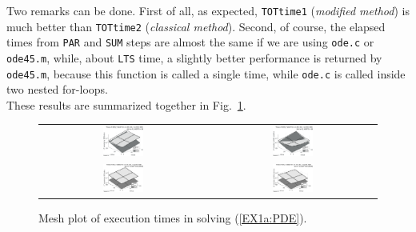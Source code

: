 \documentclass[a4paper,10pt]{report}%
\begin{document}
Two remarks can be done. First of all, as expected, {\tt TOTtime1} ({\em modified method}) is much better than
{\tt TOTtime2} ({\em classical method}). Second, of course, the elapsed times from {\tt PAR} and {\tt SUM}
steps are almost the same if we are using {\tt ode.c} or {\tt ode45.m}, while, about {\tt LTS} time, a slightly
better performance is returned by {\tt ode45.m}, because this function is called a single time, while {\tt ode.c} is called inside two nested for-loops.
\\
These results are summarized together in Fig.~\ref{EX1a_times3D_tol4}.
\begin{figure}[htb]
\centering
\begin{tabular}{cc}
\includegraphics[width=0.25\textwidth]{./FIGS/EX1a/EX1a_times3D_tol4_1.eps} &
\includegraphics[width=0.25\textwidth]{./FIGS/EX1a/EX1a_times3D_tol4_3.eps} \\
\includegraphics[width=0.25\textwidth]{./FIGS/EX1a/EX1a_times3D_tol4_2.eps} &
\includegraphics[width=0.25\textwidth]{./FIGS/EX1a/EX1a_times3D_tol4_4.eps}
\end{tabular}
\caption{\small Mesh plot of execution times in solving (\ref{EX1a:PDE}).}
\label{EX1a_times3D_tol4}
\end{figure}
\end{document}
